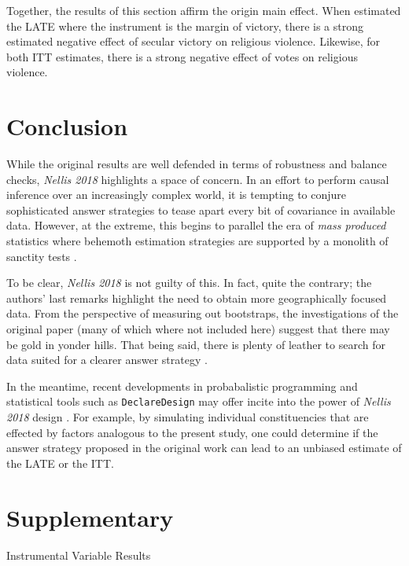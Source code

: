 \documentclass{scrartcl}
\begin{document}
Together, the results of this section affirm the origin main effect. 
When estimated the LATE where the instrument is the margin of victory, there is a strong estimated negative effect of secular victory on religious violence.
Likewise, for both ITT estimates, there is a strong negative effect of votes on religious violence.

\section{Conclusion}

While the original results are well defended in terms of robustness and balance checks, \textit{Nellis 2018} highlights a space of concern.
In an effort to perform causal inference over an increasingly complex world, it is tempting to conjure sophisticated answer strategies to tease apart every bit of covariance in available data.
However, at the extreme, this begins to parallel the era of \textit{mass produced} statistics where behemoth estimation strategies are supported by a monolith of sanctity tests \cite{freedman_1985}.

To be clear, \textit{Nellis 2018} is not guilty of this.
In fact, quite the contrary; the authors' last remarks highlight the need to obtain more geographically focused data.
From the perspective of measuring out bootstraps, the investigations of the original paper (many of which where not included here) suggest that there may be gold in yonder hills. 
That being said, there is plenty of leather to search for data suited for a clearer answer strategy \cite{freedman_1991}.

In the meantime, recent developments in probabalistic programming and statistical tools such as \texttt{DeclareDesign} may offer incite into the power of \textit{Nellis 2018} design \cite{declaredesign}.
For example, by simulating individual constituencies that are effected by factors analogous to the present study, one could determine if the answer strategy proposed in the original work can lead to an unbiased estimate of the LATE or the ITT.


\clearpage
\section{Supplementary}

\begin{table}[h!]
  \begin{center}
    \scalebox{0.75}{
      
    }
    \caption{Instrumental Variable Results}
    \label{table:iv_full}
  \end{center}
\end{table}
\end{document}
